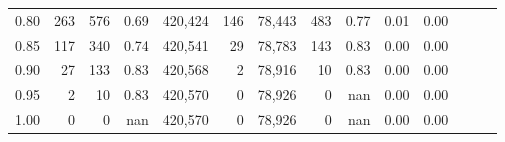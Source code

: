\begin{tabular}{rrrrrrrrrrrrrr}
0.80 &      263 &     576 &  0.69 &  420,424 &      146 &  78,443 &     483 &  0.77 &  0.01 &      0.00 \\
0.85 &      117 &     340 &  0.74 &  420,541 &       29 &  78,783 &     143 &  0.83 &  0.00 &      0.00 \\
0.90 &       27 &     133 &  0.83 &  420,568 &        2 &  78,916 &      10 &  0.83 &  0.00 &      0.00 \\
0.95 &        2 &      10 &  0.83 &  420,570 &        0 &  78,926 &       0 &   nan &  0.00 &      0.00 \\
1.00 &        0 &       0 &   nan &  420,570 &        0 &  78,926 &       0 &   nan &  0.00 &      0.00 \\
\bottomrule
\end{tabular}
